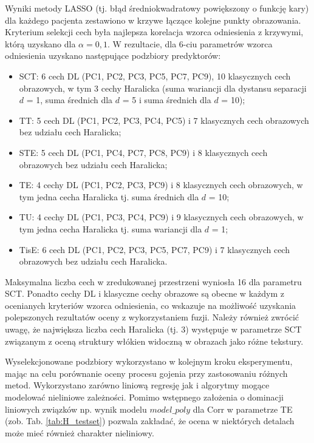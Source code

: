 Wyniki metody LASSO (tj. błąd średniokwadratowy powiększony o funkcję kary) dla każdego pacjenta zestawiono w krzywe łączące kolejne punkty obrazowania.
Kryterium selekcji cech była najlepsza korelacja wzorca odniesienia z krzywymi, którą uzyskano dla $\alpha=0,1$. W rezultacie, dla 6-ciu parametrów wzorca odniesienia uzyskano następujące podzbiory predyktorów:  
\begin{itemize}[noitemsep,nolistsep]
	\item SCT: 6 cech DL (PC1, PC2, PC3, PC5, PC7, PC9), 10 klasycznych cech obrazowych, w tym 3 cechy Haralicka (suma wariancji dla dystansu separacji $d$ = 1, suma średnich dla $d$ = 5 i suma średnich dla $d$ = 10);
	\item TT: 5 cech DL (PC1, PC2, PC3, PC4, PC5) i 7 klasycznych cech obrazowych bez udziału cech Haralicka;
	\item STE: 5 cech DL (PC1, PC4, PC7, PC8, PC9) i 8 klasycznych cech obrazowych bez udziału cech Haralicka;
	\item TE: 4 cechy DL (PC1, PC2, PC3, PC9) i 8 klasycznych cech obrazowych, \linebreak w tym jedna cecha Haralicka tj. suma średnich dla $d$ = 10;
	\item TU: 4 cechy DL (PC1, PC3, PC4, PC9) i 9 klasycznych cech obrazowych, \linebreak w tym jedna cecha Haralicka tj. suma wariancji dla $d$ = 1;  
	\item TisE: 6 cech DL (PC1, PC2, PC3, PC5, PC7, PC9) i 7 klasycznych cech obrazowych bez udziału cech Haralicka.
	
\end{itemize}
Maksymalna liczba cech w zredukowanej przestrzeni wyniosła 16 dla parametru SCT. Ponadto cechy DL i klasyczne cechy obrazowe są obecne w każdym z ocenianych kryteriów wzorca odniesienia, co wskazuje na możliwość uzyskania polepszonych rezultatów oceny z wykorzystaniem fuzji. Należy również zwrócić uwagę, \linebreak że największa liczba cech Haralicka (tj. 3) występuje w parametrze SCT związanym z oceną struktury włókien widoczną w obrazach jako różne tekstury.

Wyselekcjonowane podzbiory wykorzystano w kolejnym kroku eksperymentu, mając na celu porównanie oceny procesu gojenia przy zastosowaniu różnych metod. Wykorzystano zarówno liniową regresję jak i algorytmy mogące modelować nieliniowe zależności. Pomimo wstępnego założenia o dominacji liniowych związków np. wynik modelu $model\_poly$ dla Corr w parametrze TE (zob. Tab. \ref{tab:H_testset}) pozwala zakładać, że ocena w niektórych detalach może mieć również charakter nieliniowy. 

